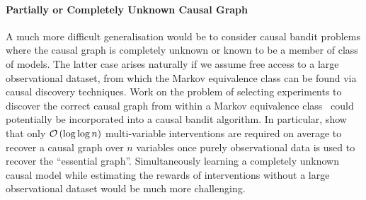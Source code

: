 



\paragraph{Partially or Completely Unknown Causal Graph}
A much more difficult generalisation would be to consider causal bandit problems where the causal graph is completely unknown or known to be a member of class of models.
The latter case arises naturally if we assume free access to a large observational dataset, from which the Markov equivalence class can be found via causal discovery techniques. 
Work on the problem of selecting experiments to discover the correct causal graph from within a Markov equivalence class~\cite{Eberhardt2005,eberhardt2010causal,hauser2014two,Hu2014b} could potentially be incorporated into a causal bandit algorithm.
In particular, \citet{Hu2014b} show that only $\mathcal{O}\left( \log \log n \right)$ multi-variable interventions are required on average to recover a causal graph over $n$ variables once purely observational data is used to recover the ``essential graph''.
Simultaneously learning a completely unknown causal model while estimating the rewards of interventions without a large observational dataset would be much more challenging.




